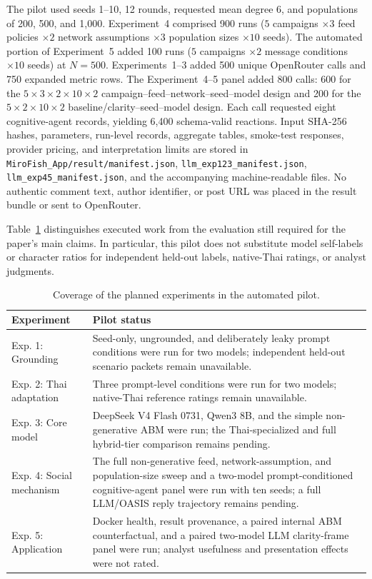 \documentclass[conference]{IEEEtran}
\begin{document}
The pilot used seeds 1--10, 12 rounds, requested mean degree 6, and populations
of 200, 500, and 1,000. Experiment~4 comprised 900 runs
($5$ campaigns $\times 3$ feed policies $\times 2$ network assumptions
$\times 3$ population sizes $\times 10$ seeds). The automated portion of
Experiment~5 added 100 runs ($5$ campaigns $\times 2$ message conditions
$\times 10$ seeds) at $N=500$. Experiments~1--3 added 500 unique OpenRouter
calls and 750 expanded metric rows. The Experiment~4--5 panel added 800 calls:
600 for the $5\times3\times2\times10\times2$
campaign--feed--network--seed--model design and 200 for the
$5\times2\times10\times2$ baseline/clarity--seed--model design. Each call
requested eight cognitive-agent records, yielding 6,400 schema-valid reactions.
Input SHA-256 hashes, parameters, run-level
records, aggregate tables, smoke-test responses, provider pricing, and
interpretation limits are stored in \texttt{MiroFish\_App/result/manifest.json},
\texttt{llm\_exp123\_manifest.json}, \texttt{llm\_exp45\_manifest.json}, and
the accompanying machine-readable
files. No authentic comment text, author identifier, or post URL was placed in
the result bundle or sent to OpenRouter.

Table~\ref{tab:pilot-coverage} distinguishes executed work from the evaluation
still required for the paper's main claims. In particular, this pilot does not
substitute model self-labels or character ratios for independent held-out
labels, native-Thai ratings, or analyst judgments.

\begin{table}[t]
\caption{Coverage of the planned experiments in the automated pilot.}
\label{tab:pilot-coverage}
\centering
\footnotesize
\begin{tabular}{@{}p{}p{}@{}}
\toprule
Experiment & Pilot status \\
\midrule
Exp. 1: Grounding & Seed-only, ungrounded, and deliberately leaky prompt
conditions were run for two models; independent held-out scenario packets
remain unavailable. \\
Exp. 2: Thai adaptation & Three prompt-level conditions were run for two
models; native-Thai reference ratings remain unavailable. \\
Exp. 3: Core model & DeepSeek V4 Flash 0731, Qwen3 8B, and the simple
non-generative ABM were run; the Thai-specialized and full hybrid-tier
comparison remains pending. \\
Exp. 4: Social mechanism & The full non-generative feed, network-assumption,
and population-size sweep and a two-model prompt-conditioned cognitive-agent
panel were run with ten seeds; a full LLM/OASIS reply trajectory remains pending. \\
Exp. 5: Application & Docker health, result provenance, a paired internal ABM
counterfactual, and a paired two-model LLM clarity-frame panel were run;
analyst usefulness and presentation effects were not rated. \\
\bottomrule
\end{tabular}
\end{table}
\end{document}

